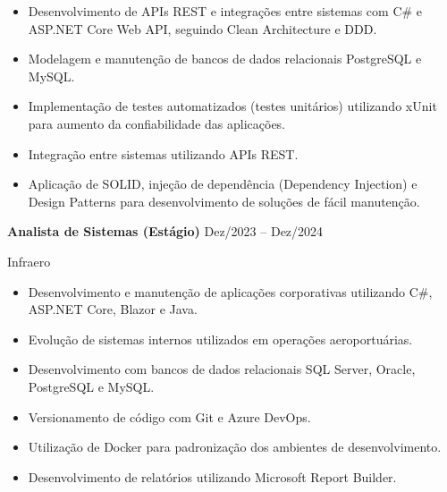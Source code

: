 \documentclass[11pt,a4paper]{article}
\begin{document}
\begin{itemize}[leftmargin=*,noitemsep,topsep=2pt]

\item Desenvolvimento de APIs REST e integrações entre sistemas com C\# e ASP.NET Core Web API, seguindo Clean Architecture e DDD.

\item Modelagem e manutenção de bancos de dados relacionais PostgreSQL e MySQL.

\item Implementação de testes automatizados (testes unitários) utilizando xUnit para aumento da confiabilidade das aplicações.

\item Integração entre sistemas utilizando APIs REST.

\item Aplicação de SOLID, injeção de dependência (Dependency Injection) e Design Patterns para desenvolvimento de soluções de fácil manutenção.

\end{itemize}

\vspace{0.4cm}

\textbf{Analista de Sistemas (Estágio)}
\hfill Dez/2023 -- Dez/2024

Infraero

\begin{itemize}[leftmargin=*,noitemsep,topsep=2pt]

\item Desenvolvimento e manutenção de aplicações corporativas utilizando C\#, ASP.NET Core, Blazor e Java.

\item Evolução de sistemas internos utilizados em operações aeroportuárias.

\item Desenvolvimento com bancos de dados relacionais SQL Server, Oracle, PostgreSQL e MySQL.

\item Versionamento de código com Git e Azure DevOps.

\item Utilização de Docker para padronização dos ambientes de desenvolvimento.

\item Desenvolvimento de relatórios utilizando Microsoft Report Builder.

\end{itemize}
\end{document}
